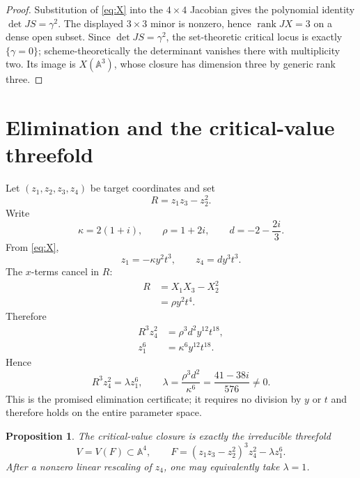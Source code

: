 \documentclass[11pt]{article}
\newtheorem{proposition}[theorem]{Proposition}
\theoremstyle{definition}
\newcommand{\A}{\mathbb A}
\newcommand{\rank}{\operatorname{rank}}
\begin{document}
\begin{proof}
Substitution of \eqref{eq:X} into the $4\times4$ Jacobian gives the polynomial identity $\det JS=\gamma^2$. The displayed $3\times3$ minor is nonzero, hence $\rank JX=3$ on a dense open subset. Since $\det JS=\gamma^2$, the set-theoretic critical locus is exactly $\{\gamma=0\}$; scheme-theoretically the determinant vanishes there with multiplicity two. Its image is $X(\A^3)$, whose closure has dimension three by generic rank three.
\end{proof}

\section{Elimination and the critical-value threefold}

Let $(z_1,z_2,z_3,z_4)$ be target coordinates and set
\[
R=z_1z_3-z_2^2.
\]
Write
\[
\kappa=2(1+i),
\qquad
\rho=1+2i,
\qquad
 d=-2-\frac{2i}{3}.
\]
From \eqref{eq:X},
\[
z_1=-\kappa y^2t^3,
\qquad
z_4=d y^3t^3.
\]
The $x$-terms cancel in $R$:
\begin{align*}
R
&=X_1X_3-X_2^2\\
&=\rho y^2t^4.
\end{align*}
Therefore
\begin{align*}
R^3z_4^2
&=\rho^3d^2y^{12}t^{18},\\
z_1^6
&=\kappa^6y^{12}t^{18}.
\end{align*}
Hence
\begin{equation}
R^3z_4^2=\lambda z_1^6,
\qquad
\lambda=\frac{\rho^3d^2}{\kappa^6}
=\frac{41-38i}{576}\neq0.
\label{eq:implicit}
\end{equation}
This is the promised elimination certificate; it requires no division by $y$ or $t$ and therefore holds on the entire parameter space.

\begin{proposition}\label{prop:closure}
The critical-value closure is exactly the irreducible threefold
\[
V=V(F)\subset\A^4,
\qquad
F=(z_1z_3-z_2^2)^3z_4^2-\lambda z_1^6.
\]
After a nonzero linear rescaling of $z_4$, one may equivalently take $\lambda=1$.
\end{proposition}
\end{document}

